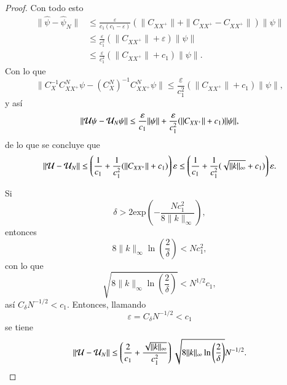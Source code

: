 \begin{proof}
    Con todo esto
    \[
    \begin{aligned}
        \| \hat{\psi} - \hat{\psi}_N \| & \leq \frac{\varepsilon}{c_1(c_1 - \varepsilon)}
    (\| C_{XX^+} \| + \| C_{XX^+} - C_{XX^+} \| ) \| \psi \| \\
    & \leq \frac{\varepsilon}{c_1^2}
    (\| C_{XX^+} \| + \varepsilon ) \| \psi \| \\
    & \leq \frac{\varepsilon}{c_1^2}
    (\| C_{XX^+} \| + c_1 ) \| \psi \|.
    \end{aligned}
    \]
    Con lo que
    \[
    \| C_X^{-1} C_{XX^+}^N \psi - \left (C_X^N \right )^{-1} C_{XX^+}^N \psi \| \leq \frac{\varepsilon}{c_1^2}
    (\| C_{XX^+} \| + c_1 ) \| \psi \|,
    \]
    y así
    \[
    \| \mathcal{U} \psi - \mathcal{U}_N \psi \| \leq \frac{\varepsilon}{c_1} \| \psi \| + \frac{\varepsilon}{c_1^2}
    (\| C_{XX^+} \| + c_1 ) \| \psi \|,
    \]
    de lo que se concluye que
    \[
    \| \mathcal{U} - \mathcal{U}_N \| \leq \left ( \frac{1}{c_1} + \frac{1}{c_1^2}
    (\| C_{XX^+} \| + c_1 ) \right ) \varepsilon \leq \left ( \frac{1}{c_1} + \frac{1}{c_1^2}
    (\sqrt{\| k \|_{\infty}} + c_1 ) \right ) \varepsilon.
    \]

    Si
    \[
    \delta > 2\text{exp} \left ( - \frac{N c_1^2}{8 \| k \|_\infty} \right ),
    \]
    entonces
    \[
    8 \| k \|_{\infty} \ln \left ( \frac{2}{\delta} \right ) < N c_1^2,
    \]
    con lo que
    \[
    \sqrt{8 \| k \|_{\infty} \ln \left ( \frac{2}{\delta} \right )} < N^{1/2} c_1,
    \]
    así $C_\delta N^{-1/2} < c_1$. Entonces, llamando
    \[
    \varepsilon = C_\delta N^{-1/2} < c_1
    \]
    se tiene
     \[
    \| \mathcal{U} - \mathcal{U}_N \| \leq \left ( \frac{2}{c_1} + \frac{\sqrt{\| k \|_{\infty}}}{c_1^2}
  \right )\sqrt{8 \| k \|_\infty \ln \left ( \frac{2}{\delta}\right ) } N^{-1/2}.
    \]
\end{proof}


